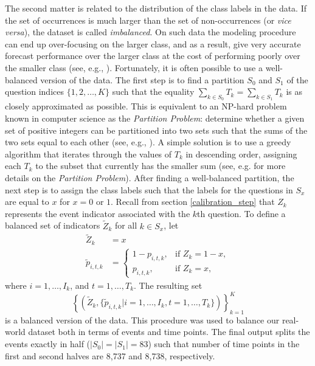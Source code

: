 \documentclass[aoas, preprint]{imsart}
\numberwithin{equation}{section}
\theoremstyle{plain}
\begin{document}
The second matter is related to the distribution of the class labels in the data. If the set of occurrences is much larger than the set of non-occurrences (or \textit{vice versa}), the dataset is called \textit{imbalanced}. On such data the modeling procedure can end up over-focusing on the larger class, and as a result, give very accurate forecast performance over the larger class at the cost of performing poorly over the smaller class (see, e.g., \citet{chen2009learning, wallace2012class}). Fortunately, it is often possible to use a well-balanced version of the data. The first step is to find a partition $S_0$ and $S_1$ of the question indices $\{1, 2, \dots, K\}$ such that the equality $\sum_{k \in S_0} T_k  = \sum_{k \in S_1} T_k$ is as closely approximated as possible. This is equivalent to an NP-hard problem known in computer science as the \textit{Partition Problem}:  determine whether a given set of positive integers can be partitioned into two sets such that the sums of the two sets equal to each other (see, e.g., \citet{karmarkar1982differencing, hayes2002easiest}). A simple solution is to use a greedy algorithm that iterates through the values of $T_k$ in descending order, assigning each $T_k$ to the subset that currently has the smaller sum (see, e.g. \citet{kellerer2004knapsack, gent1996phase} for more details on the \textit{Partition Problem}). After finding a well-balanced partition, the next step is to assign the class labels such that the labels for the questions in $S_x$ are equal to $x$ for $x = 0$ or $1$. Recall from section \ref{calibration_step} that $Z_k$ represents the event indicator associated with the $k$th question. To define a balanced set of indicators $ \tilde{Z}_k$ for all $k \in S_x$, let
\begin{align*}
 \tilde{Z}_k &= x\\
\tilde{p}_{i,t,k} &=  \begin{cases} 
1-p_{i,t,k}, & \text{if } Z_k = 1-x,\\
p_{i,t,k}, & \text{if } Z_k = x,
\end{cases}
\end{align*}
where $i = 1, \dots, I_k$, and $t = 1, \dots, T_k$. The resulting set $$\left\{\left(\tilde{Z}_k, \{\tilde{p}_{i,t,k} | i = 1, \dots, I_k, t = 1, \dots, T_k \}\right) \right\}_{k=1}^K$$ is a balanced version of the data. 
This procedure was used to balance our real-world dataset both in terms of events and time points. The final output splits the events exactly in half ($|S_0| = |S_1| = 83$) such that number of time points in the first and second halves are 8,737 and 8,738, respectively. 
\end{document}

